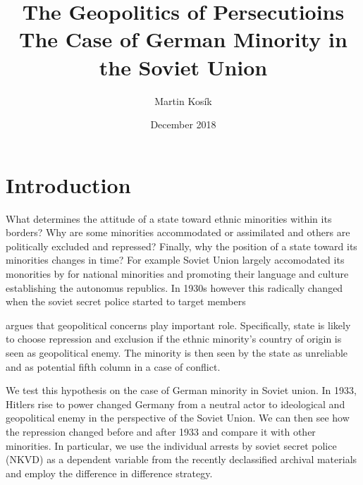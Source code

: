 \documentclass[12pt]{article}
\title{The Geopolitics of Persecutioins \\
  \large The Case of German Minority in the Soviet Union}
\author{Martin Kosík}
\date{December 2018}
\begin{document}
\maketitle


\section{Introduction}
What determines the attitude of a state toward ethnic minorities within its borders? Why are some minorities accommodated or assimilated and others are politically excluded and repressed? Finally, why the position of a state toward its minorities changes in time? For example Soviet Union largely accomodated its monorities by  for national minorities and promoting their language and culture establishing the autonomus republics. In 1930s however this radically changed when the soviet secret police started to target members

\citet{mylonas_politics_2013} argues that geopolitical concerns play important role. Specifically, state is likely to choose repression and exclusion if the ethnic minority's country of origin is seen as geopolitical enemy. The minority is then seen by the state as unreliable and  as potential fifth column in a case of conflict.  

We test this hypothesis on the case of German minority in Soviet union.
In 1933, Hitlers rise to power changed Germany from a neutral actor to ideological and geopolitical enemy in the perspective of the Soviet Union. We can then see how the repression changed before and after 1933 and compare it with other minorities. In particular, we use the individual arrests by soviet secret police (NKVD) as a dependent variable from the recently declassified archival materials and employ the difference in difference strategy. 

\end{document}
